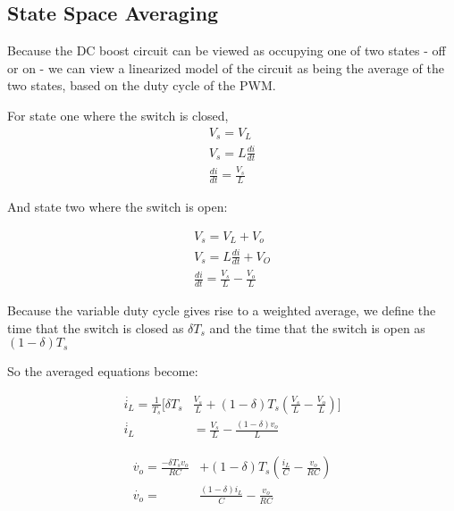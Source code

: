 \subsection{State Space Averaging}

Because the DC boost circuit can be viewed as occupying one of two states - off or on - we can view a linearized model of the circuit as being the average of the two states, based on the duty cycle of the PWM. 

For state one where the switch is closed, 
\begin{equation}
\begin{split}
V_s = V_L \\
V_s = L\frac{di}{dt} \\
\frac{di}{dt} = \frac{V_s}{L}
\end{split}
\end{equation}

And state two where the switch is open:

\begin{equation}
\begin{split}
V_s = V_L + V_o\\
V_s = L\frac{di}{dt} + V_O \\
\frac{di}{dt} = \frac{V_s}{L} - \frac{V_o}{L}
\end{split}
\end{equation}

Because the variable duty cycle gives rise to a weighted average, we define the time that the switch is closed as $\delta T_s$ and the time that the switch is open as $(1-\delta)T_s$

So the averaged equations become: 

\begin{equation}
\begin{split}
\dot{i_L} = \frac{1}{T_s}[\delta T_s & \frac{V_s}{L} + (1-\delta)T_s(\frac{V_s}{L} - \frac{V_o}{L})] \\
\dot{i_L} &= \frac{V_s}{L} - \frac{(1-\delta)v_o}{L}
\end{split}
\end{equation}

\begin{equation}
\begin{split}
\dot{v_o} = \frac{-\delta T_s v_o}{RC}& +  (1-\delta)T_s(\frac{i_L}{C} - \frac{v_o}{RC})\\
\dot{v_o} = &\frac{(1-\delta)i_L}{C} - \frac{v_o}{RC}
\end{split}
\end{equation}

